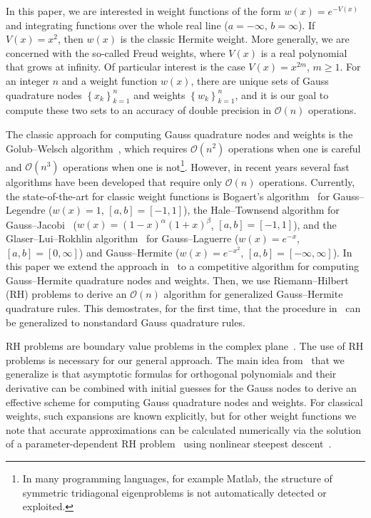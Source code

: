 \documentclass[final]{siamltex}
\begin{document}
In this paper, we are interested in weight functions of the form $w(x) = e^{-V(x)}$ 
and integrating functions over the whole real line ($a=-\infty$, $b=\infty$). If $V(x)=x^2$, then $w(x)$ is the classic 
Hermite weight. More generally, we are concerned with the so-called Freud weights, where 
$V(x)$ is a real polynomial that grows at infinity.  Of particular interest is the case $V(x) = x^{2m}$, $m\geq 1$. For an integer $n$ and a weight function $w(x)$, there are unique 
sets of Gauss quadrature nodes $\left\{x_k\right\}_{k=1}^n$ and weights $\left\{w_k\right\}_{k=1}^n$, and it is our goal 
to compute these two sets to an accuracy of double precision in $\mathcal{O}(n)$ operations. 

The classic approach for computing Gauss quadrature nodes and weights is the Golub--Welsch algorithm~\cite{Golub_69_01}, 
which requires $\mathcal{O}(n^2)$ operations when one is careful and $\mathcal{O}(n^3)$ operations when one is not\footnote{In many programming languages, for example {\sc Matlab}, 
the structure of symmetric tridiagonal eigenproblems is not automatically detected or exploited.}. 
However, in recent years several fast algorithms have been developed that require only $\mathcal{O}(n)$ operations. Currently, 
the state-of-the-art for classic weight functions is Bogaert's algorithm~\cite{Bogaert_14_01} for Gauss--Legendre ($w(x)=1$, $[a,b] = [-1,1]$), the Hale--Townsend algorithm 
for Gauss--Jacobi~\cite{Hale_13_01} ($w(x)=(1-x)^\alpha(1+x)^{\beta}$, $[a,b]=[-1,1]$), and the Glaser--Lui--Rokhlin algorithm~\cite{Glaser_07_01} for 
Gauss--Laguerre ($w(x)=e^{-x}$, $[a,b]=[0,\infty]$) and Gauss--Hermite ($w(x) = e^{-x^2}$, $[a,b]=[-\infty,\infty]$). In this paper 
we extend the approach in~\cite{Hale_13_01} to a competitive algorithm for computing Gauss--Hermite quadrature nodes and weights. 
Then, we use Riemann--Hilbert (RH) problems to derive an $\mathcal{O}(n)$ algorithm for generalized Gauss--Hermite quadrature
rules. This demostrates, for the first time, that the procedure in~\cite{Hale_13_01} can 
be generalized to nonstandard Gauss quadrature rules.

RH problems are boundary value problems in the complex plane~\cite{AblowitzFokas,Deift_Book,TrogdonThesis}.  
The use of RH problems is necessary for our general approach. The main idea from~\cite{Hale_13_01} that we 
generalize is that asymptotic formulas for orthogonal polynomials and their derivative can be combined with 
initial guesses for the Gauss nodes to derive an effective scheme for computing Gauss quadrature 
nodes and weights.  For classical weights, such expansions are known explicitly, but for other
weight functions we note that accurate approximations can be calculated numerically 
via the solution of a parameter-dependent RH problem~\cite{Deift_Book,TrogdonSORMT} using 
nonlinear steepest descent~\cite{DeiftZhouAMS,TrogdonSONNSD}.
\end{document}
